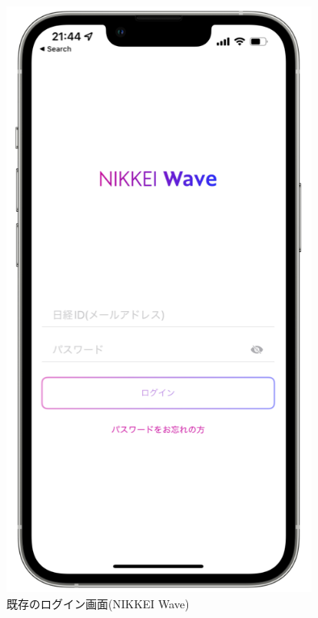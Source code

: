 \begin{figure}[htbp]
  \begin{minipage}{\hsize}
    \begin{center}
       \includegraphics[width=100mm]{img/wave_screenshot.png}
    \end{center}
    \caption{既存のログイン画面(NIKKEI Wave)}
    \label{fig:wave_screenshot}
  \end{minipage}
\end{figure}


